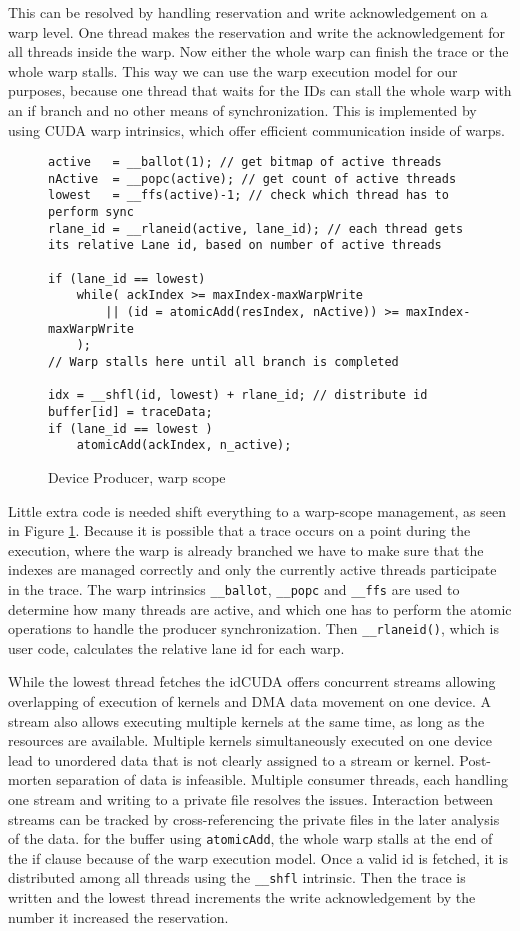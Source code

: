 	This can be resolved by handling reservation and write acknowledgement on a warp level. One thread makes the reservation and write the acknowledgement for all threads inside the warp. Now either the whole warp can finish the trace or the whole warp stalls. This way we can use the warp execution model for our purposes, because one thread that waits for the IDs can stall the whole warp with an if branch and no other means of synchronization. This is implemented by using CUDA warp intrinsics, which offer efficient communication inside of warps.
\begin{figure}[t]
	\begin{lstlisting}[style=C]
active   = __ballot(1); // get bitmap of active threads 
nActive  = __popc(active); // get count of active threads
lowest   = __ffs(active)-1; // check which thread has to perform sync
rlane_id = __rlaneid(active, lane_id); // each thread gets its relative Lane id, based on number of active threads
	
if (lane_id == lowest)
	while( ackIndex >= maxIndex-maxWarpWrite 
		|| (id = atomicAdd(resIndex, nActive)) >= maxIndex-maxWarpWrite
	);
// Warp stalls here until all branch is completed

idx = __shfl(id, lowest) + rlane_id; // distribute id
buffer[id] = traceData;
if (lane_id == lowest )
	atomicAdd(ackIndex, n_active);\end{lstlisting}
	\caption{Device Producer, warp scope}
	\label{prod-cons-warp}	
\end{figure}
	Little extra code is needed shift everything to a warp-scope management, as seen in Figure \ref{prod-cons-warp}. Because it is possible that a trace occurs on a point during the execution, where the warp is already branched we have to make sure
	that the indexes are managed correctly and only the currently active threads participate in the trace. The warp intrinsics \verb|__ballot|, \verb|__popc| and \verb|__ffs| are used to determine how many threads are active, and which one has to perform the atomic operations to handle
	the producer synchronization. Then \verb|__rlaneid()|, which is user code, calculates the relative lane id for each warp. 
	
	While the lowest thread fetches the idCUDA offers concurrent streams allowing overlapping of execution of kernels and DMA data movement on one device.
	A stream also allows executing multiple kernels at the same time, as long as the resources are available. Multiple kernels simultaneously executed on one device lead to unordered data that is not clearly assigned to a stream or kernel. Post-morten separation of data is infeasible. Multiple consumer threads, each handling one stream and writing to a private file resolves the issues. Interaction between streams can be tracked by cross-referencing the private files in the later analysis of the data.
	 for the buffer using \verb|atomicAdd|, the whole warp stalls at the end of the if clause because of the warp execution model. Once a valid id is fetched, it is distributed among all threads using the \verb|__shfl| intrinsic. 	Then the trace is written and the lowest thread increments the write acknowledgement by the number it increased the reservation.
	
